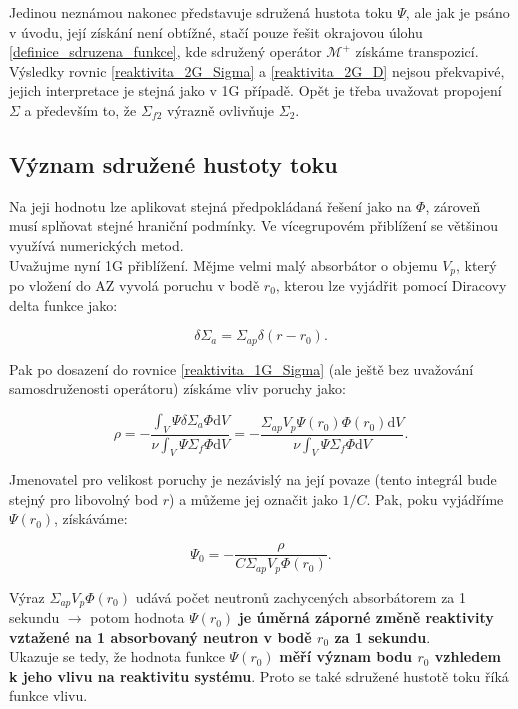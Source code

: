 Jedinou neznámou nakonec představuje sdružená hustota toku $\Psi$, ale jak je psáno v úvodu, její získání není obtížné, stačí pouze řešit okrajovou úlohu \eqref{definice_sdruzena_funkce}, kde sdružený operátor $\mathcal{M^+}$ získáme transpozicí.\\

Výsledky rovnic \eqref{reaktivita_2G_Sigma} a \eqref{reaktivita_2G_D} nejsou překvapivé, jejich interpretace je stejná jako v 1G případě. Opět je třeba uvažovat propojení $\Sigma$ a především to, že $\Sigma_{f2}$ výrazně ovlivňuje $\Sigma_2$.

\subsection{Význam sdružené hustoty toku}

Na jeji hodnotu lze aplikovat stejná předpokládaná řešení jako na $\Phi$, zároveň musí splňovat stejné hraniční podmínky. Ve vícegrupovém přiblížení se většinou využívá numerických metod.\\

Uvažujme nyní 1G přiblížení. Mějme velmi malý absorbátor o objemu $V_p$, který po vložení do AZ vyvolá poruchu v bodě $r_0$, kterou lze vyjádřit pomocí Diracovy delta funkce jako:

$$ \delta \Sigma_a = \Sigma_{ap} \delta (r - r_0). $$

Pak po dosazení do rovnice \eqref{reaktivita_1G_Sigma} (ale ještě bez uvažování samosdruženosti operátoru) získáme vliv poruchy jako:

$$ \rho = - \dfrac{\int_V \Psi \delta \Sigma_a \Phi \text{d}V}{\nu \int_V \Psi \Sigma_f \Phi \text{d}V} = - \dfrac{\Sigma_{ap} V_p \Psi(r_0) \Phi(r_0) \text{d}V}{\nu \int_V \Psi \Sigma_f \Phi \text{d}V}. $$

Jmenovatel pro velikost poruchy je nezávislý na její povaze (tento integrál bude stejný pro libovolný bod $r$) a můžeme jej označit jako $1/C$. Pak, poku vyjádříme $\Psi(r_0)$, získáváme:

$$ \Psi_0 = - \dfrac{\rho}{C \Sigma_{ap} V_p \Phi(r_0)}. $$

Výraz $\Sigma_{ap} V_p \Phi(r_0)$ udává počet neutronů zachycených absorbátorem za 1 sekundu $\rightarrow$ potom hodnota $\Psi(r_0)$ \textbf{je úměrná záporné změně reaktivity vztažené na 1 absorbovaný neutron v bodě $r_0$ za 1 sekundu}.\\

Ukazuje se tedy, že hodnota funkce $\Psi(r_0)$ \textbf{měří význam bodu $r_0$ vzhledem k jeho vlivu na reaktivitu systému}. Proto se také sdružené hustotě toku říká funkce vlivu.\\

